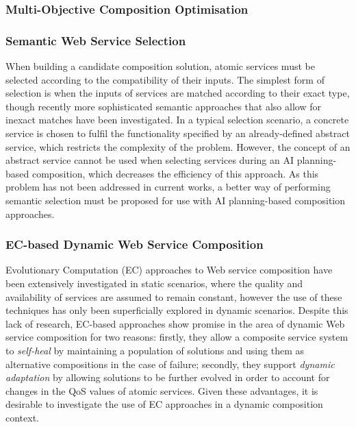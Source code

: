 \subsubsection{Multi-Objective Composition Optimisation}

\subsubsection{Semantic Web Service Selection}
When building a candidate composition solution, atomic services must be selected according to the compatibility of their inputs. The simplest form of selection is when the inputs of services are matched according to their exact type, though recently more sophisticated semantic approaches that also allow for inexact matches have been investigated. In a typical selection scenario, a concrete service is chosen to fulfil the functionality specified by an already-defined abstract service, which restricts the complexity of the problem. However, the concept of an abstract service cannot be used when selecting services during an AI planning-based composition, which decreases the efficiency of this approach. As this problem has not been addressed in current works, a better way of performing semantic selection must be proposed for use with AI planning-based composition approaches.

\subsubsection{EC-based Dynamic Web Service Composition}
Evolutionary Computation (EC) approaches to Web service composition have been extensively investigated in static scenarios, where the quality and availability of services are assumed to remain constant, however the use of these techniques has only been superficially explored in dynamic scenarios. Despite this lack of research, EC-based approaches show promise in the area of dynamic Web service composition for two reasons: firstly, they allow a composite service system to \emph{self-heal} by maintaining a population of solutions and using them as alternative compositions in the case of failure; secondly, they support \emph{dynamic adaptation} by allowing solutions to be further evolved in order to account for changes in the QoS values of atomic services. Given these advantages, it is desirable to investigate the use of EC approaches in a dynamic composition context.

